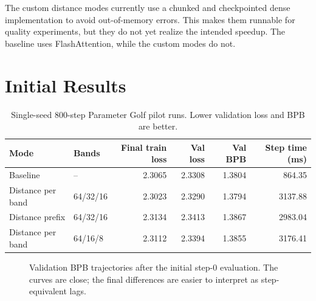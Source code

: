 \documentclass[11pt]{article}
\begin{document}
The custom distance modes currently use a chunked and checkpointed dense implementation to avoid out-of-memory errors. This makes them runnable for quality experiments, but they do not yet realize the intended speedup. The baseline uses FlashAttention, while the custom modes do not.

\section{Initial Results}

\begin{table}[h]
\centering
\small
\begin{tabular}{llrrrr}
\toprule
Mode & Bands & Final train loss & Val loss & Val BPB & Step time (ms) \\
\midrule
Baseline & -- & 2.3065 & 2.3308 & 1.3804 & 864.35 \\
Distance per band & 64/32/16 & 2.3023 & 2.3290 & 1.3794 & 3137.88 \\
Distance prefix & 64/32/16 & 2.3134 & 2.3413 & 1.3867 & 2983.04 \\
Distance per band & 64/16/8 & 2.3112 & 2.3394 & 1.3855 & 3176.41 \\
\bottomrule
\end{tabular}
\caption{Single-seed 800-step Parameter Golf pilot runs. Lower validation loss and BPB are better.}
\end{table}

\begin{figure}[h]
\centering
{}
\caption{Validation BPB trajectories after the initial step-0 evaluation. The curves are close; the final differences are easier to interpret as step-equivalent lags.}
\end{figure}
\end{document}
